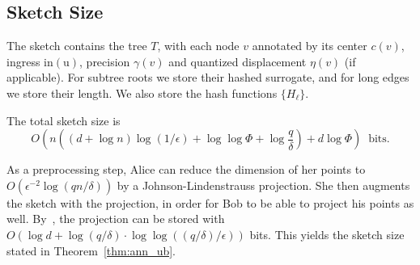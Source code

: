 \subsection{Sketch Size}
The sketch contains the tree $T$, with each node $v$ annotated by its center $c(v)$, ingress $\mathrm{in(u)}$, precision $\gamma(v)$ and quantized displacement $\eta(v)$ (if applicable). For subtree roots we store their hashed surrogate, and for long edges we store their length. We also store the hash functions $\{H_\ell\}$.
\begin{lemma}\label{lmm:sketch_size}
The total sketch size is
\[
  O \left( n\left((d+\log n)\log(1/\epsilon) + \log\log\Phi + \log\frac{q}{\delta}\right) + d\log\Phi \right)
  \;\; \text{bits.}
\]
\end{lemma}
%

As a preprocessing step, Alice can reduce the dimension of her points to $O(\epsilon^{-2}\log(qn/\delta))$ by a Johnson-Lindenstrauss projection.
She then augments the sketch with the projection, in order for Bob to be able to project his points as well.
By~\cite{kane2011almost}, the projection can be stored with $O(\log d + \log(q/\delta)\cdot\log\log((q/\delta)/\epsilon))$ bits.
This yields the sketch size stated in Theorem~\ref{thm:ann_ub}.


